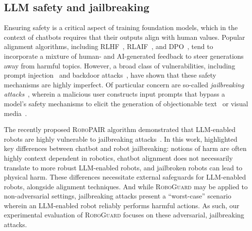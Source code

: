 \subsection{LLM safety and jailbreaking}

Ensuring safety is a critical aspect of training foundation models, which in the context of chatbots requires that their outputs align with human values. Popular alignment algorithms, including RLHF~\cite{ouyang2022training}, RLAIF~\cite{bai2022constitutional}, and DPO~\cite{rafailov2024direct}, tend to incorporate a mixture of human- and AI-generated feedback to steer generations away from harmful topics.  However, a broad class of vulnerabilities, including prompt injection~\cite{liu2023prompt,perez2022ignore} and backdoor attacks~\cite{huang2023composite},
have shown that these safety mechanisms are highly imperfect.  
Of particular concern are so-called \emph{jailbreaking attacks}~\cite{wei2024jailbroken,carlini2024aligned}, wherein a malicious user constructs input prompts that bypass a model's safety mechanisms to elicit the generation of objectionable text~\cite{zou2023universal,chao2023jailbreaking,liu2023autodan} or visual media~\cite{dong2023robust,hu2024transferable,qi2024visual}.

The recently proposed \textsc{RoboPAIR} algorithm demonstrated that LLM-enabled robots are highly vulnerable to jailbreaking attacks~\cite{robey2024jailbreaking}. 
In this work, \citet{robey2024jailbreaking} highlighted key differences between chatbot and robot jailbreaking: notions of harm are often highly context dependent in robotics, chatbot alignment does not necessarily translate to more robust LLM-enabled robots, and jailbroken robots can lead to physical harm.
These differences necessitate external safeguards for LLM-enabled robots, alongside alignment techniques. 
And while \textsc{RoboGuard}  may be applied to non-adversarial settings, jailbreaking attacks present a ``worst-case'' scenario wherein an LLM-enabled robot reliably performs harmful actions.
As such, our experimental evaluation of \textsc{RoboGuard} focuses on these adversarial, jailbreaking attacks.




